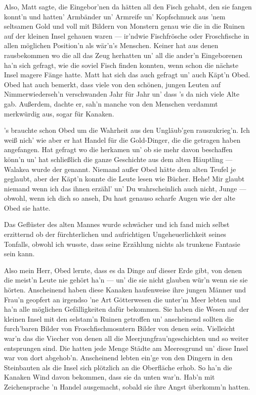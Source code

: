 Also, Matt sagte, die Eingebor'nen da hätten all den Fisch gehabt, den sie fangen konnt'n und hatten' Armbänder un' Armreife un' Kopfschmuck aus 'nem seltsamen Gold und voll mit Bildern von Monstern genau wie die in die Ruinen auf der kleinen Insel gehauen waren --- ir'ndwie Fischfrösche oder Froschfische in allen möglichen Position'n als wär'n's Menschen. Keiner hat aus denen rausbekommen wo die all das Zeug herhatten un' all die ander'n Eingeborenen ha'n sich gefragt, wie die soviel Fisch finden konnten, wenn schon die nächste Insel magere Fänge hatte. Matt hat sich das auch gefragt un' auch Käpt'n Obed. Obed hat auch bemerkt, dass viele von den schönen, jungen Leuten auf Nimmerwiederseh'n verschwanden Jahr für Jahr un' dass 's da nich viele Alte gab. Außerdem, dachte er, sah'n manche von den Menschen verdammt merkwürdig aus, sogar für Kanaken.

's brauchte schon Obed um die Wahrheit aus den Ungläub'gen rauszukrieg'n. Ich weiß nich' wie aber er hat Handel für die Gold-Dinger, die die getragen haben angefangen. Hat gefragt wo die herkamen un' ob sie mehr davon beschaffen könn'n un' hat schließlich die ganze Geschichte aus dem alten Häuptling --- Walakea wurde der genannt. Niemand außer Obed hätte dem alten Teufel je geglaubt, aber der Käpt'n konnte die Leute lesen wie Bücher. Hehe! Mir glaubt niemand wenn ich das ihnen erzähl' un' Du wahrscheinlich auch nicht, Junge --- obwohl, wenn ich dich so anseh, Du hast genauso scharfe Augen wie der alte Obed sie hatte.\grqq

Das Geflüster des alten Mannes wurde schwächer und ich fand mich selbst erzitternd ob der fürchterlichen und aufrichtigen Ungeheuerlichkeit seines Tonfalls, obwohl ich wusste, dass seine Erzählung nichts als trunkene Fantasie sein kann.

\glqq Also mein Herr, Obed lernte, dass es da Dinge auf dieser Erde gibt, von denen die meist'n Leute nie gehört ha'n --- un' die sie nicht glauben wür'n wenn sie sie hörten. Anscheinend haben diese Kanaken haufenweise ihre jungen Männer und Frau'n geopfert an irgendso 'ne Art Götterwesen die unter'm Meer lebten und ha'n alle möglichen Gefälligkeiten dafür bekommen. Sie haben die Wesen auf der kleinen Insel mit den selstam'n Ruinen getroffen un' anscheinend sollten die furch'baren Bilder von Froschfischmosntern Bilder von denen sein. Vielleicht war'n das die Viecher von denen all die Meerjungfrau'ngeschichten und so weiter entsprungen sind. Die hatten jede Menge Städte am Meeresgrund un' diese Insel war von dort abgehob'n. Anscheinend lebten ein'ge von den Dingern in den Steinbauten als die Insel sich plötzlich an die Oberfläche erhob. So ha'n die Kanaken Wind davon bekommen, dass sie da unten war'n. Hab'n mit Zeichensprache 'n Handel ausgemacht, sobald sie ihre Angst überkomm'n hatten.

